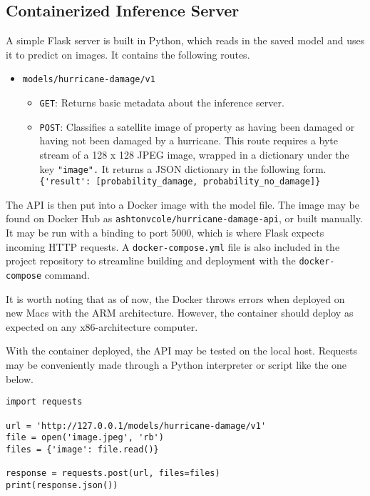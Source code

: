 \documentclass{article}
\begin{document}
\subsection{Containerized Inference Server}

A simple Flask server is built in Python, which reads in the saved model and uses it to predict on images. It contains the following routes.

\begin{itemize}
	\item \verb|models/hurricane-damage/v1|
	\begin{itemize}
		\item \verb|GET|: Returns basic metadata about the inference server.
		\item \verb|POST|: Classifies a satellite image of property as having been damaged or having not been damaged by a hurricane. This route requires a byte stream of a 128 x 128 JPEG image, wrapped in a dictionary under the key \verb|"image".| It returns a JSON dictionary in the following form.
		\verb|{'result': [probability_damage, probability_no_damage]}|
	\end{itemize}
\end{itemize}

The API is then put into a Docker image with the model file. The image may be found on Docker Hub as \verb|ashtonvcole/hurricane-damage-api|, or built manually. It may be run with a binding to port 5000, which is where Flask expects incoming HTTP requests. A \verb|docker-compose.yml| file is also included in the project repository to streamline building and deployment with the \verb|docker-compose| command.

It is worth noting that as of now, the Docker throws errors when deployed on new Macs with the ARM architecture. However, the container should deploy as expected on any x86-architecture computer.

With the container deployed, the API may be tested on the local host. Requests may be conveniently made through a Python interpreter or script like the one below.

\begin{lstlisting}
import requests

url = 'http://127.0.0.1/models/hurricane-damage/v1'
file = open('image.jpeg', 'rb')
files = {'image': file.read()}

response = requests.post(url, files=files)
print(response.json())
\end{lstlisting}
\end{document}
